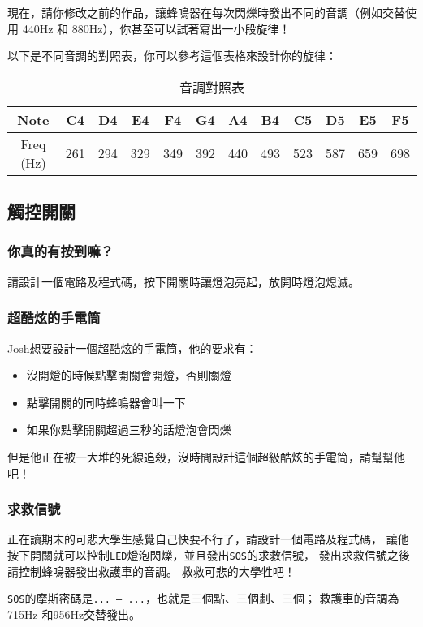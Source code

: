\documentclass[12pt,a4paper]{article}
\begin{document}
現在，請你修改之前的作品，讓蜂鳴器在每次閃爍時發出不同的音調（例如交替使用 440Hz 和 880Hz），你甚至可以試著寫出一小段旋律！

以下是不同音調的對照表，你可以參考這個表格來設計你的旋律：
\begin{table}[h!]
\centering
\begin{tabular}{|c|c|c|c|c|c|c|c|c|c|c|c|}
\hline
Note & C4 & D4 & E4 & F4 & G4 & A4 & B4 & C5 & D5 & E5 & F5 \\ \hline
Freq (Hz) & 261 & 294 & 329 & 349 & 392 & 440 & 493 & 523 & 587 & 659 & 698 \\ \hline
\end{tabular}
\caption{音調對照表}
\label{tab:freq_table}
\end{table}

\subsection{觸控開關}
\subsubsection{你真的有按到嘛？}
請設計一個電路及程式碼，按下開關時讓燈泡亮起，放開時燈泡熄滅。

\subsubsection{超酷炫的手電筒}
Josh想要設計一個超酷炫的手電筒，他的要求有：
\begin{itemize}
    \item 沒開燈的時候點擊開關會開燈，否則關燈
    \item 點擊開關的同時蜂鳴器會叫一下
    \item 如果你點擊開關超過三秒的話燈泡會閃爍
\end{itemize}

但是他正在被一大堆的死線追殺，沒時間設計這個超級酷炫的手電筒，請幫幫他吧！

\subsubsection{求救信號}
正在讀期末的可悲大學生感覺自己快要不行了，請設計一個電路及程式碼，
讓他按下開關就可以控制\texttt{LED}燈泡閃爍，並且發出\texttt{SOS}的求救信號，
發出求救信號之後請控制蜂鳴器發出救護車的音調。
救救可悲的大學牲吧！

\texttt{SOS}的摩斯密碼是\texttt{... --- ...}，也就是三個點、三個劃、三個；
救護車的音調為715Hz 和956Hz交替發出。
\end{document}
